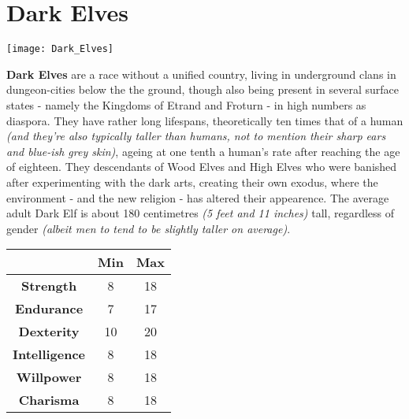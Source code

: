 \section{Dark Elves}


\texttt{[image: Dark\_Elves]}


\textbf{Dark Elves} are a race without a unified country, living in underground clans in dungeon-cities below the the ground, though also being present in several surface states - namely the Kingdoms of Etrand and Froturn - in high numbers as diaspora. They have rather long lifespans, theoretically ten times that of a human \textit{(and they're also typically taller than humans, not to mention their sharp ears and blue-ish grey skin)}, ageing at one tenth a human's rate after reaching the age of eighteen. They descendants of Wood Elves and High Elves who were banished after experimenting with the dark arts, creating their own exodus, where the environment - and the new religion - has altered their appearence. The average adult Dark Elf is about 180 centimetres \textit{(5 feet and 11 inches)} tall, regardless of gender \textit{(albeit men to tend to be slightly taller on average)}.


\begin{tabular}{|c|c|c|}
\hline
 & \textbf{Min} & \textbf{Max} \\ \hline
\textbf{Strength} & 8 & 18 \\ \hline
\textbf{Endurance} & 7 & 17 \\ \hline
\textbf{Dexterity} & 10 & 20 \\ \hline
\textbf{Intelligence} & 8 & 18 \\ \hline
\textbf{Willpower} & 8 & 18 \\ \hline
\textbf{Charisma} & 8 & 18 \\ \hline
\end{tabular}


 \newpage
